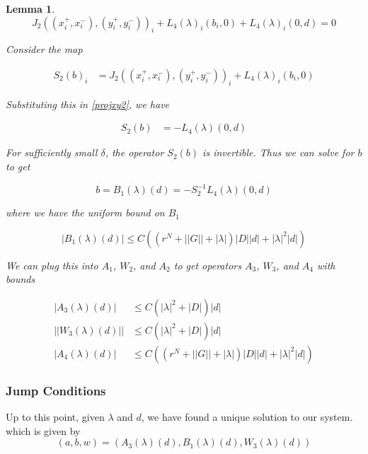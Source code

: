 \documentclass[12pt]{article}
\newtheorem{lemma}{Lemma}
\begin{document}
\begin{lemma}
\begin{equation}\label{projxy2}
J_2( (x_i^+, x_i^-),(y_i^+, y_i^-))_i 
+ L_4(\lambda)_i(b_i, 0) + L_4(\lambda)_i(0, d) = 0
\end{equation}

Consider the map

\begin{align*}
S_2(b)_i &= J_2( (x_i^+, x_i^-),(y_i^+, y_i^-))_i 
+ L_4(\lambda)_i(b_i, 0) 
\end{align*}

Substituting this in \eqref{projxy2}, we have

\begin{align*}
S_2(b) &= -L_4(\lambda)(0, d)
\end{align*}

For sufficiently small $\delta$, the operator $S_2(b)$ is invertible. Thus we can solve for $b$ to get

\begin{equation}
b = B_1(\lambda)(d) = -S_2^{-1} L_4(\lambda)(0, d)
\end{equation}

where we have the uniform bound on $B_1$

\begin{equation}
|B_1(\lambda)(d)| \leq C \left( (r^{N} + ||G|| + |\lambda|)|D| |d| + |\lambda|^2 |d| \right) 
\end{equation}

We can plug this into $A_1$, $W_2$, and $A_2$ to get operators $A_3$, $W_3$, and $A_4$ with bounds

\begin{align*}
|A_3(\lambda)(d)| &\leq C \left(|\lambda|^2 + |D|\right)|d|\\
||W_3(\lambda)(d)|| &\leq C \left(|\lambda|^2 + |D|\right)|d| \\
|A_4(\lambda)(d)| &\leq 
C\left( (r^N + ||G|| + |\lambda|)|D||d| + |\lambda|^2 |d|  \right)
\end{align*}

\end{lemma}

\subsubsection{Jump Conditions}

Up to this point, given $\lambda$ and $d$, we have found a unique solution to our system. which is given by
\[
(a, b, w) = (A_3(\lambda)(d), B_1(\lambda)(d), W_3(\lambda)(d))
\]
\end{document}
